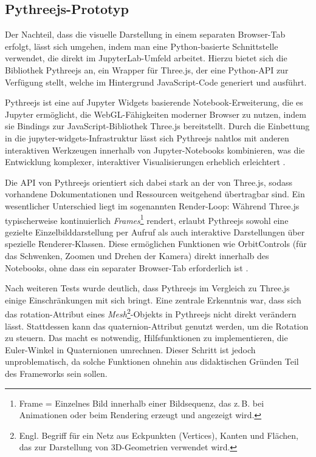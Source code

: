 \subsection{Pythreejs-Prototyp}
Der Nachteil, dass die visuelle Darstellung in einem separaten Browser-Tab erfolgt,
lässt sich umgehen, indem man eine Python-basierte Schnittstelle verwendet, die direkt im JupyterLab-Umfeld arbeitet.
Hierzu bietet sich die Bibliothek Pythreejs an, ein Wrapper für Three.js, der eine Python-API zur Verfügung stellt,
welche im Hintergrund JavaScript-Code generiert und ausführt.

Pythreejs ist eine auf Jupyter Widgets basierende Notebook-Erweiterung,
die es Jupyter ermöglicht, die WebGL-Fähigkeiten moderner Browser zu nutzen, indem sie Bindings zur JavaScript-Bibliothek Three.js bereitstellt.
Durch die Einbettung in die jupyter-widgets-Infrastruktur lässt sich Pythreejs nahtlos mit anderen interaktiven Werkzeugen innerhalb von Jupyter-Notebooks kombinieren,
was die Entwicklung komplexer, interaktiver Visualisierungen erheblich erleichtert .

Die API von Pythreejs orientiert sich dabei stark an der von Three.js,
sodass vorhandene Dokumentationen und Ressourcen weitgehend übertragbar sind.
Ein wesentlicher Unterschied liegt im sogenannten Render-Loop: Während Three.js typischerweise kontinuierlich \textit{Frames}\footnote{Frame = Einzelnes Bild innerhalb einer Bildsequenz, das z.\,B. bei Animationen oder beim Rendering erzeugt und angezeigt wird.} rendert,
erlaubt Pythreejs sowohl eine gezielte Einzelbilddarstellung per Aufruf als auch interaktive Darstellungen über spezielle Renderer-Klassen.
Diese ermöglichen Funktionen wie OrbitControls (für das Schwenken, Zoomen und Drehen der Kamera) direkt innerhalb des Notebooks,
ohne dass ein separater Browser-Tab erforderlich ist .

Nach weiteren Tests wurde deutlich, dass Pythreejs im Vergleich zu Three.js einige Einschränkungen mit sich bringt.
Eine zentrale Erkenntnis war, dass sich das rotation-Attribut eines \textit{Mesh}\footnote{Engl. Begriff für ein Netz aus Eckpunkten (Vertices), Kanten und Flächen, das zur Darstellung von 3D-Geometrien verwendet wird.}-Objekts in Pythreejs nicht direkt verändern lässt.
Stattdessen kann das quaternion-Attribut genutzt werden, um die Rotation zu steuern. Das macht es notwendig, Hilfsfunktionen zu implementieren,
die Euler-Winkel in Quaternionen umrechnen. Dieser Schritt ist jedoch unproblematisch, da solche Funktionen ohnehin aus didaktischen Gründen Teil des Frameworks sein sollen.


